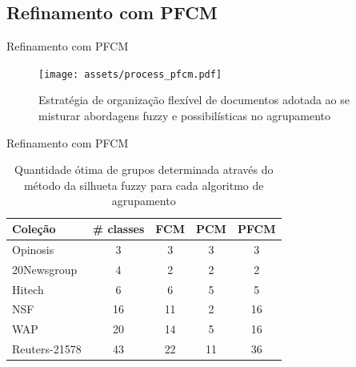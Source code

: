 \documentclass[brazil]{beamer}
\begin{document}
\subsection{Refinamento com PFCM}

\begin{frame}{Refinamento com PFCM}
  \begin{figure}[!htp] 
    \centering
    \texttt{[image: assets/process\_pfcm.pdf]} 
    \caption{Estratégia de organização flexível de documentos adotada ao se misturar abordagens fuzzy
    e possibilísticas no agrupamento} 
    \label{fig:flexibleorganization} 
  \end{figure}
\end{frame}

\begin{frame}{Refinamento com PFCM}
\begin{table}[!htp]
  \centering
  \begin{tabular}{ |l|c|c|c|c|}
    \hline
    {\bf Coleção} & {\bf \# classes} & {\bf FCM} & {\bf PCM} & {\bf PFCM} \\
    \hline
    Opinosis      & 3 &   \alert{3}   & 3 & {\color{blue}3} \\
    \hline
    20Newsgroup   & 4 &   \alert{2}   & 2 & {\color{blue}2} \\
    \hline
    Hitech        & 6 &   \alert{6}   & 5 & {\color{blue}5} \\
    \hline
    NSF           & 16 &  \alert{11}  & 2 & {\color{blue}16} \\
    \hline
    WAP           & 20 &  \alert{14}  & 5 & {\color{blue}16} \\
    \hline
    Reuters-21578 & 43 &  \alert{22}  & 11 & {\color{blue}36} \\
    \hline
  \end{tabular}
  \caption{Quantidade ótima de grupos determinada através do método da silhueta fuzzy para cada
  algoritmo de agrupamento}
  \label{table:pfcmclusters}
\end{table}
\end{frame}
\end{document}
